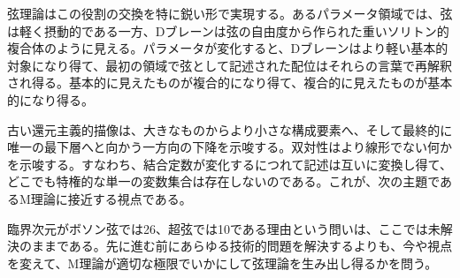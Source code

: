 弦理論はこの役割の交換を特に鋭い形で実現する。あるパラメータ領域では、弦は軽く摂動的である一方、Dブレーンは弦の自由度から作られた重いソリトン的複合体のように見える。パラメータが変化すると、Dブレーンはより軽い基本的対象になり得て、最初の領域で弦として記述された配位はそれらの言葉で再解釈され得る。基本的に見えたものが複合的になり得て、複合的に見えたものが基本的になり得る。

古い還元主義的描像は、大きなものからより小さな構成要素へ、そして最終的に唯一の最下層へと向かう一方向の下降を示唆する。双対性はより線形でない何かを示唆する。すなわち、結合定数が変化するにつれて記述は互いに変換し得て、どこでも特権的な単一の変数集合は存在しないのである。これが、次の主題であるM理論に接近する視点である。

臨界次元がボソン弦では26、超弦では10である理由という問いは、ここでは未解決のままである。先に進む前にあらゆる技術的問題を解決するよりも、今や視点を変えて、M理論が適切な極限でいかにして弦理論を生み出し得るかを問う。